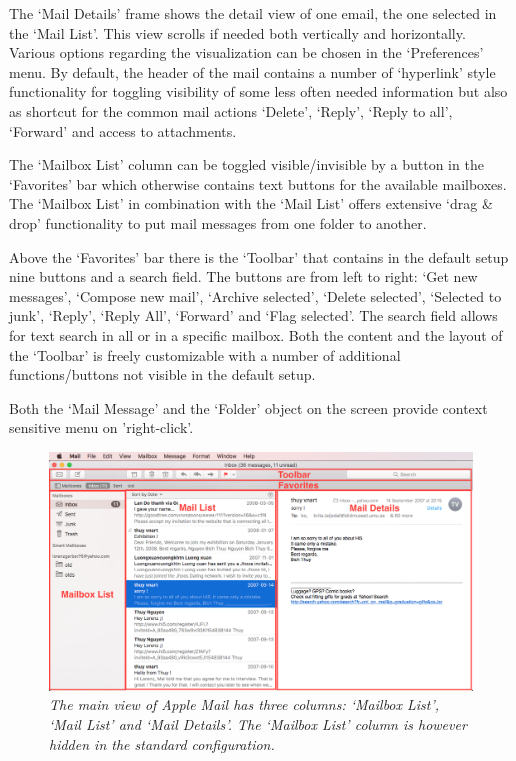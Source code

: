 \documentclass[a4paper,11pt,twoside]{article}
\begin{document}
The `Mail Details' frame shows the detail view of one email, the one selected in
the `Mail List'. This view scrolls if needed both vertically and horizontally.
Various options regarding the visualization can be chosen in the `Preferences'
menu. By default, the header of the mail contains a number of `hyperlink' style
functionality for toggling visibility of some less often needed information but
also as shortcut for the common mail actions `Delete', `Reply', `Reply to all',
`Forward' and access to attachments.

The `Mailbox List' column can be toggled visible/invisible
by a button in the `Favorites' bar which otherwise contains text buttons for the
available mailboxes. The `Mailbox List' in combination with the `Mail List' offers
extensive `drag \& drop' functionality to put mail messages from one folder to
another.

Above the `Favorites' bar there is the `Toolbar' that contains in the default
setup nine buttons and a search field. The buttons are from left to right:
`Get new messages', `Compose new mail', `Archive selected', `Delete selected',
`Selected to junk', `Reply', `Reply All', `Forward' and `Flag selected'. The
search field allows for text search in all or in a specific mailbox. Both
the content and the layout of the `Toolbar' is freely customizable with a number
of additional functions/buttons not visible in the default setup.

Both the `Mail Message' and the `Folder' object on the screen provide context
sensitive menu on 'right-click'.

\begin{figure}
  \centering
    \includegraphics[width=1\textwidth]{main_screen}
    \caption{\textit{The main view of Apple Mail has three columns: `Mailbox List',
    `Mail List' and `Mail Details'. The `Mailbox List' column is however
    hidden in the standard configuration.}}
    \label{fig:apple_main_screen}
\end{figure}
\end{document}
